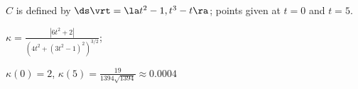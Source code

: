 {$C$ is defined by $\ds \vrt = \la t^2-1,t^3-t\ra $; points given at $t=0$ and $t=5$. 
}
{$\kappa = \frac{|6t^2+2|}{\left(4t^2+(3t^2-1)^2\right)^{3/2}}$;

$\kappa(0) = 2$, $\kappa(5) = \frac{19}{1394\sqrt{1394}}\approx 0.0004$
}
